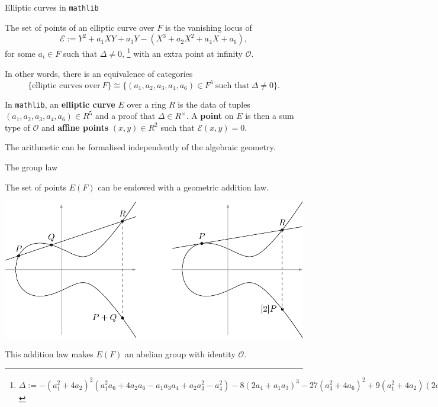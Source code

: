 \documentclass[10pt]{beamer}
\begin{document}
\begin{frame}[t]{Elliptic curves in \texttt{mathlib}}

\begin{corollary}
The set of points of an elliptic curve over $ F $ is the vanishing locus of
$$ \mathcal{E} := Y^2 + a_1XY + a_3Y - (X^3 + a_2X^2 + a_4X + a_6), $$
for some $ a_i \in F $ such that $ \Delta \ne 0 $, \footnote{\tiny $ \Delta := -(a_1^2 + 4a_2)^2(a_1^2a_6 + 4a_2a_6 - a_1a_3a_4 + a_2a_3^2 - a_4^2) - 8(2a_4 + a_1a_3)^3 - 27(a_3^2 + 4a_6)^2 + 9(a_1^2 + 4a_2)(2a_4 + a_1a_3)(a_3^2 + 4a_6) $} with an extra point at infinity $ \mathcal{O} $.
\end{corollary}

\pause

\vspace{0.5cm} In other words, there is an equivalence of categories
$$ \{\text{elliptic curves over} \ F\} \cong \{(a_1, a_2, a_3, a_4, a_6) \in F^5 \ \text{such that} \ \Delta \ne 0\}. $$

\pause

In \texttt{mathlib}, an \textbf{elliptic curve} $ E $ over a ring $ R $ is the data of tuples $ (a_1, a_2, a_3, a_4, a_6) \in R^5 $ and a proof that $ \Delta \in R^\times $. A \textbf{point} on $ E $ is then a sum type of $ \mathcal{O} $ and \textbf{affine points} $ (x, y) \in R^2 $ such that $ \mathcal{E}(x, y) = 0 $.

\pause

\vspace{0.5cm} The arithmetic can be formalised independently of the algebraic geometry.

\end{frame}

\begin{frame}[t]{The group law}

The set of points $ E(F) $ can be endowed with a geometric addition law.

\begin{center}
\includegraphics[width=\textwidth]{grouplaw.png}
\end{center}

\pause

\begin{theorem}
This addition law makes $ E(F) $ an abelian group with identity $ \mathcal{O} $.
\end{theorem}

\end{frame}
\end{document}
